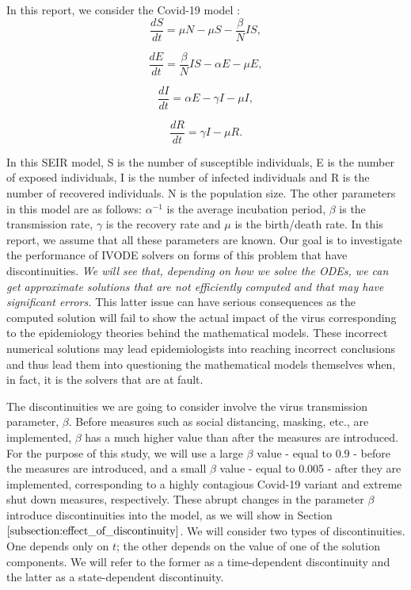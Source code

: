 In this report, we consider the Covid-19 model \cite{pdeModel}:
\begin{equation}
\frac{\textit{d}S}{\textit{dt}} = \mu N - \mu S - \frac{\beta}{N}IS, \nonumber
\end{equation}

\begin{equation}
\frac{\textit{d}E}{\textit{dt}} = \frac{\beta}{N}IS - \alpha E - \mu E, \nonumber
\end{equation}

\begin{equation}
\frac{\textit{d}I}{\textit{dt}} = \alpha E - \gamma I - \mu I, \nonumber
\end{equation}

\begin{equation}
\frac{\textit{d}R}{\textit{dt}} = \gamma I - \mu R. \nonumber
\end{equation} 

In this SEIR model, S is the number of susceptible individuals, E is the number of exposed individuals, I is the number of infected individuals and R is the number of recovered individuals. N is the population size.
The other parameters in this model are as follows: $\alpha^{-1}$ is the average incubation period, $\beta$ is the transmission rate, $\gamma$ is the recovery rate and $\mu$ is the birth/death rate. In this report, we assume that all these parameters are known. Our goal is to investigate the performance of IVODE solvers on forms of this problem that have discontinuities. {\it We will see that, depending on how we solve the ODEs, we can get approximate solutions that are not efficiently computed and that may have significant errors.} This latter issue can have serious consequences as the computed solution will fail to show the actual impact of the virus corresponding to the epidemiology theories behind the mathematical models. These incorrect numerical solutions may lead epidemiologists into reaching incorrect conclusions and thus lead them into questioning the mathematical models themselves when, in fact, it is the solvers that are at fault.

The discontinuities we are going to consider involve the virus transmission parameter, $\beta$.
Before measures such as social distancing, masking, etc., are implemented, $\beta$ has a much higher value than after the measures are introduced. For the purpose of this study, we will use a large $\beta$ value - equal to 0.9 - before the measures are introduced, and a small $\beta$ value - equal to 0.005 - after they are implemented, corresponding to a highly contagious Covid-19 variant and extreme shut down measures, respectively. These  abrupt changes in the parameter $\beta$ introduce discontinuities into the model, as we will show in Section $\ref{subsection:effect_of_discontinuity}$. We will consider two types of discontinuities. One depends only on $t$; the other depends on the value of one of the solution components. We will refer to the former as a time-dependent discontinuity and the latter as a state-dependent discontinuity.

